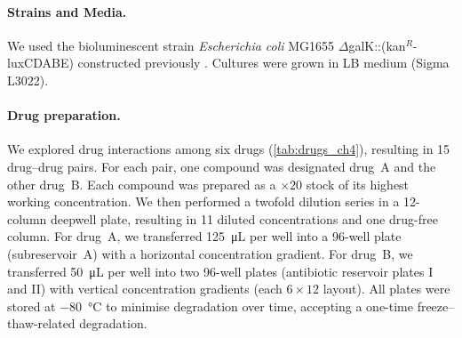 \paragraph{Strains and Media.}
We used the bioluminescent strain \textit{Escherichia coli} MG1655 \(\Delta\)galK::(kan\(^R\)-luxCDABE) constructed previously \cite{Muetter2026}.
Cultures were grown in LB medium (Sigma L3022).

\paragraph{Drug preparation.}
We explored drug interactions among six drugs (\autoref{tab:drugs_ch4}), resulting in \num{15} drug--drug pairs.
For each pair, one compound was designated drug~A and the other drug~B.
Each compound was prepared as a \(\times 20\) stock of its highest working concentration.
We then performed a twofold dilution series in a 12-column deepwell plate, resulting in \num{11} diluted concentrations and one drug-free column.
For drug~A, we transferred \SI{125}{\micro\liter} per well into a 96-well plate (subreservoir~A) with a horizontal concentration gradient.
For drug~B, we transferred \SI{50}{\micro\liter} per well into two 96-well plates (antibiotic reservoir plates I and II) with vertical concentration gradients (each \(6\times 12\) layout).
All plates were stored at \SI{-80}{\celsius} to minimise degradation over time, accepting a one-time freeze--thaw-related degradation.

\begin{table}
  \caption{Drugs used in the experiments, the solvent, the estimated zMIC (by fitting the single-drug pharmacodynamic curves), and the supplier with catalogue number.}
  \centering
  \small
  
  \label{tab:drugs_ch4}
\end{table}

